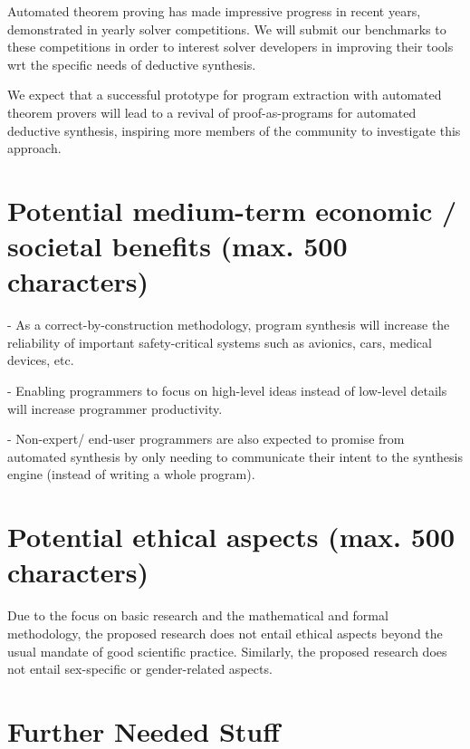 \documentclass[a4paper,12pt]{article}
\begin{document}
Automated theorem proving has made impressive progress in recent years, demonstrated in yearly solver competitions.
We will submit our benchmarks to these competitions in order to interest solver developers in improving their tools wrt the specific needs of deductive synthesis.

We expect that a successful prototype for program extraction with automated theorem provers will lead to a revival of proof-as-programs for automated deductive synthesis, inspiring more members of the community to investigate this approach.


\section{Potential medium-term economic / societal benefits (max. 500 characters)}

- As a correct-by-construction methodology, program synthesis will increase the reliability of important safety-critical systems such as avionics, cars, medical devices, etc.

\noindent - Enabling programmers to focus on high-level ideas instead of low-level details will increase programmer productivity.

\noindent - Non-expert/ end-user programmers are also expected to promise from automated synthesis by only needing to communicate their intent to the synthesis engine (instead of writing a whole program).


\section{Potential ethical aspects (max. 500 characters)}

Due to the focus on basic research and the mathematical and formal methodology, the proposed research does not entail ethical aspects beyond the usual mandate of good scientific practice.
Similarly, the proposed research does not entail sex-specific or gender-related aspects.

\section{Further Needed Stuff}
\end{document}
